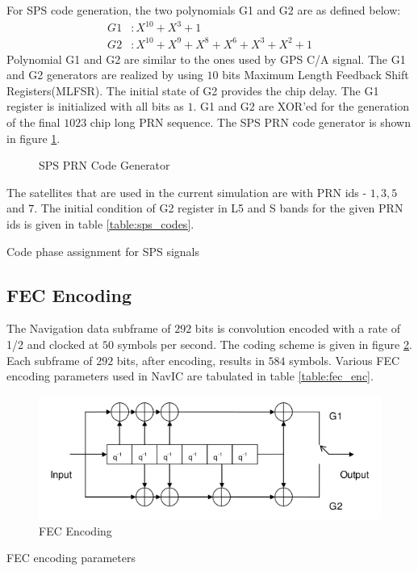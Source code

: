\noindent For SPS code generation, the two polynomials G1 and G2 are as defined below:
\begin{align}
G1 &: X^{10}+X^{3} + 1\\
G2 &: X^{10}+X^9+X^8+X^6+X^3+X^2+1
\end{align}
Polynomial G1 and G2 are similar to the ones used by GPS C/A signal. The G1 and G2 generators are realized by using $10$ bits Maximum Length Feedback Shift Registers(MLFSR). The initial state of G2 provides the chip delay. The G1 register is initialized with all bits as $1$. G1 and G2 are XOR'ed for the generation of the final $1023$ chip long PRN sequence. The SPS PRN code generator is shown in figure \ref{figure:codeGen}.

\begin{figure}[!ht]
	\centering
	
	\caption{SPS PRN Code Generator}
	\label{figure:codeGen}
\end{figure}

\noindent The satellites that are used in the current simulation are with PRN ids - $1,3,5$ and $7$. The initial condition of G2 register in L5 and S bands for the given PRN ids is given in table \ref{table:sps_codes}.

\begin{table}[h]

\vspace{3mm}
\caption{Code phase assignment for SPS signals}
\label{table:sps_codes}
\end{table}

\newpage
\subsection{FEC Encoding}
The Navigation data subframe of $292$ bits is convolution encoded with a rate of 1/2 and clocked at $50$ symbols per second. The coding scheme is given in figure \ref{fig:FEC}. Each subframe of $292$ bits, after encoding, results in $584$ symbols. Various FEC encoding parameters used in NavIC are tabulated in table \ref{table:fec_enc}.
\begin{figure}[ht]
\centering
\includegraphics[width=\columnwidth]{figs/FEC.png}
\centering
\captionsetup{justification=centering}
\caption{FEC Encoding}
\label{fig:FEC}
\end{figure}
\newpage
\begin{table}[h]

\vspace{3mm}
\caption{FEC encoding parameters}
\label{table:fec_enc}
\end{table}
